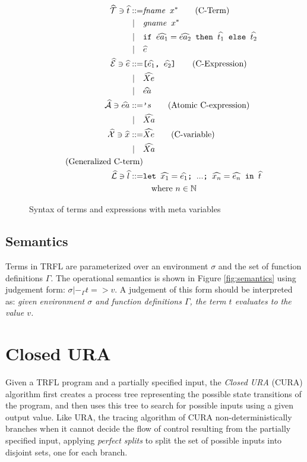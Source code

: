 \documentclass[10pt]{../sigplanconf}
\begin{document}
\begin{figure}\centering
  \begin{align*}
    \widehat{\mathcal{T}} \ni \widehat{t}
      ::=& \texttt{\textit{\rmfamily fname} $x^{*}$} \tag{C-Term} \\
    | \quad & \texttt{\textit{\rmfamily gname} $x^{*}$} \\
    | \quad & \texttt{if $\widehat{ea_1} = \widehat{ea_2}$ then $\widehat{t_1}$ else $\widehat{t_2}$} \\
    | \quad & \widehat{e} \\
    \widehat{\mathcal{E}} \ni \widehat{e} ::=& \texttt{[$\widehat{e_1}$, $\widehat{e_2}$]} \tag{C-Expression} \\
    | \quad & \widehat{Xe} \\
    | \quad & \widehat{ea} \\
    \widehat{\mathcal{A}} \ni \widehat{ea} ::= & \texttt{'}s \tag{Atomic C-expression} \\
    | \quad & \widehat{Xa} \\
    \widehat{\mathcal{X}} \ni \widehat{x} ::= & \widehat{Xe} \tag{C-variable} \\
    | \quad & \widehat{Xa} \\
    \tag{Generalized C-term} \\
    \widehat{\mathcal{L}} \ni \widehat{l} ::= & \texttt{let $\widehat{x_1} = \widehat{e_1}$; $...$; $\widehat{x_n} = \widehat{e_n}$ in $\widehat{t}$} \\
    & \quad \textrm{where}\ n \in \mathbb{N}
  \end{align*}

\caption{Syntax of terms and expressions with meta variables}
\label{fig:cbnf}
\end{figure}

\subsection{Semantics}
Terms in TRFL are parameterized over an environment $\sigma$ and
the set of function definitions $\Gamma$. The operational semantics is
shown in Figure \ref{fig:semantics} using judgement form: $\sigma
|-_\Gamma t => v$. A judgement of this form should be interpreted as:
\textit{given environment $\sigma$ and function definitions $\Gamma$,
  the term $t$ evaluates to the value $v$.}

\section{Closed URA}
\label{sec:closed-ura}
Given a TRFL program and a partially specified input, the \emph{Closed
  URA} (CURA) algorithm first creates a process tree representing the
possible state transitions of the program, and then uses this tree to
search for possible inputs using a given output value. Like URA, the
tracing algorithm of CURA non-deterministically branches when it
cannot decide the flow of control resulting from the partially
specified input, applying \emph{perfect splits} to split the set of
possible inputs into disjoint sets, one for each branch.
\end{document}
